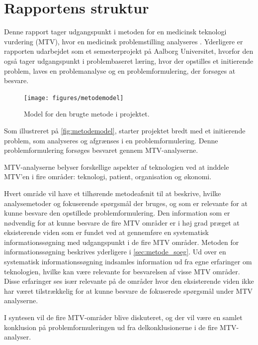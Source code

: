 \chapter{Rapportens struktur} \label{metode}
Denne rapport tager udgangspunkt i metoden for en medicinsk teknologi vurdering (MTV), hvor en medicinsk problemstilling analyseres \citep{mtvhaandbog}. Yderligere er rapporten udarbejdet som et semesterprojekt på Aalborg Universitet, hvorfor den også tager udgangspunkt i problembaseret læring, hvor der opstilles et initierende problem, laves en problemanalyse og en problemformulering, der forsøges at besvare. 

\begin{figure}[H]
	\centering
	\texttt{[image: figures/metodemodel]}
	\caption{Model for den brugte metode i projektet.}
	\label{fig:metodemodel}
\end{figure}

\noindent
Som illustreret på \autoref{fig:metodemodel}, starter projektet bredt med et initierende problem, som analyseres og afgrænses i en problemformulering. Denne problemformulering forsøges besvaret gennem MTV-analyserne. 

MTV-analyserne belyser forskellige aspekter af teknologien ved at inddele MTV'en i fire områder: teknologi, patient, organisation og økonomi. %

Hvert område vil have et tilhørende metodeafsnit til at beskrive, hvilke analysemetoder og fokuserende spørgsmål der bruges, og som er relevante for at kunne besvare den opstillede problemformulering. Den information som er nødvendig for at kunne besvare de fire MTV områder er i høj grad præget at eksisterende viden som er fundet ved at gennemføre en systematisk informationssøgning med udgangspunkt i de fire MTV områder. Metoden for informationssøgning beskrives yderligere i \autoref{sec:metode_soeg}. Ud over en systematisk informationssøgning indsamles information ud fra egne erfaringer om teknologien, hvilke kan være relevante for besvarelsen af visse MTV områder. Disse erfaringer ses især relevante på de områder hvor den eksisterende viden ikke har været tilstrækkelig for at kunne besvare de fokuserede spørgsmål under MTV analyserne.

I syntesen vil de fire MTV-områder blive diskuteret, og der vil være en samlet konklusion på problemformuleringen ud fra delkonklusionerne i de fire MTV-analyser. 


